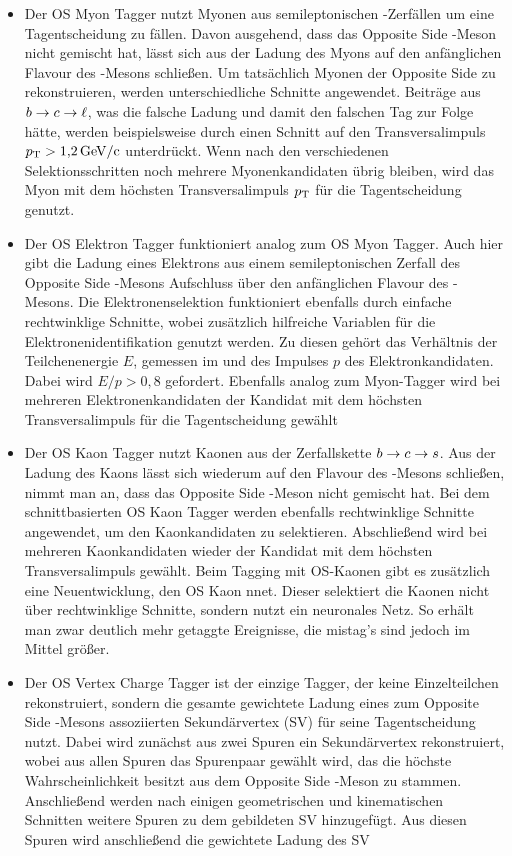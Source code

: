 \begin{itemize}
\item Der OS Myon Tagger nutzt Myonen aus semileptonischen \B-Zerfällen um eine Tagentscheidung zu fällen. Davon ausgehend, dass das Opposite Side \B-Meson nicht gemischt hat, lässt sich aus der Ladung des Myons auf den anfänglichen Flavour des \B-Mesons schließen. Um tatsächlich Myonen der Opposite Side zu rekonstruieren, werden unterschiedliche Schnitte angewendet. Beiträge aus $\bquark\rightarrow\cquark\rightarrow\lepton$, was die falsche Ladung und damit den falschen Tag zur Folge hätte, werden beispielsweise durch einen Schnitt auf den Transversalimpuls $\pt>\SI{1{,}2}{GeV\per c}$ unterdrückt. Wenn nach den verschiedenen Selektionsschritten noch mehrere Myonenkandidaten übrig bleiben, wird das Myon mit dem höchsten Transversalimpuls $\pt$ für die Tagentscheidung genutzt.
\item Der OS Elektron Tagger funktioniert analog zum OS Myon Tagger. Auch hier gibt die Ladung eines Elektrons aus einem semileptonischen Zerfall des Opposite Side \B-Mesons Aufschluss über den anfänglichen Flavour des \B-Mesons. Die Elektronenselektion funktioniert ebenfalls durch einfache rechtwinklige Schnitte, wobei zusätzlich hilfreiche Variablen für die Elektronenidentifikation genutzt werden. Zu diesen gehört das Verhältnis der Teilchenenergie $E$, gemessen im \ecal und des Impulses $p$ des Elektronkandidaten. Dabei wird $E/p>0{,}8$ gefordert. Ebenfalls analog zum Myon-Tagger wird bei mehreren Elektronenkandidaten der Kandidat mit dem höchsten Transversalimpuls \pt für die Tagentscheidung gewählt
\item Der OS Kaon Tagger nutzt Kaonen aus der Zerfallskette $\bquark\rightarrow\cquark\rightarrow\squark$. Aus der Ladung des Kaons lässt sich wiederum auf den Flavour des \B-Mesons schließen, nimmt man an, dass das Opposite Side \B-Meson nicht gemischt hat. Bei dem schnittbasierten OS Kaon Tagger werden ebenfalls rechtwinklige Schnitte angewendet, um den Kaonkandidaten zu selektieren. Abschließend wird bei mehreren Kaonkandidaten wieder der Kandidat mit dem höchsten Transversalimpuls \pt gewählt. Beim Tagging mit OS-Kaonen gibt es zusätzlich eine Neuentwicklung, den OS Kaon nnet. Dieser selektiert die Kaonen nicht über rechtwinklige Schnitte, sondern nutzt ein neuronales Netz. So erhält man zwar deutlich mehr getaggte Ereignisse, die mistag's sind jedoch im Mittel größer.
\item Der OS Vertex Charge Tagger ist der einzige Tagger, der keine Einzelteilchen rekonstruiert, sondern die gesamte gewichtete Ladung eines zum Opposite Side \B-Mesons assoziierten Sekundärvertex (SV) für seine Tagentscheidung nutzt. Dabei wird zunächst aus zwei Spuren ein Sekundärvertex rekonstruiert, wobei aus allen Spuren das Spurenpaar gewählt wird, das die höchste Wahrscheinlichkeit besitzt aus dem Opposite Side \B-Meson zu stammen. Anschließend werden nach einigen geometrischen und kinematischen Schnitten weitere Spuren zu dem gebildeten SV hinzugefügt. Aus diesen Spuren wird anschließend die gewichtete Ladung des SV

\end{itemize}
